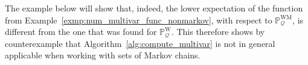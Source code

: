 \documentclass[10pt,a4paper]{paper}
\theoremstyle{definition}
\newcommand{\processes}{\mathbb{P}}
\newcommand{\wprocesses}{\processes^{\mathrm{W}}}
\newcommand{\wmprocesses}{\processes^{\mathrm{WM}}}
\newcommand{\rateset}{\mathcal{Q}}
\begin{document}
The example below will show that, indeed, the lower expectation of the function from Example~\ref{exmp:num_multivar_func_nonmarkov}, with respect to $\wmprocesses_\rateset$, is different from the one that was found for $\wprocesses_\rateset$. This therefore shows by counterexample that Algorithm~\ref{alg:compute_multivar} is not in general applicable when working with sets of Markov chains. %
\end{document}
